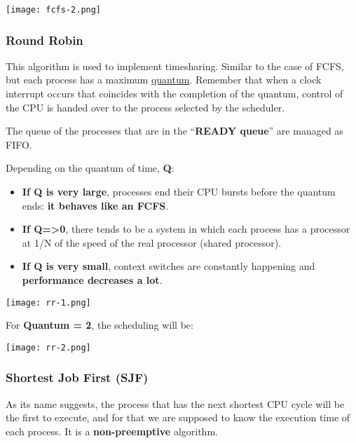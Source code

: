 \begin{center}
    \texttt{[image: fcfs-2.png]}
\end{center}


\subsubsection{Round Robin}

This algorithm is used to implement timesharing. Similar to the case of FCFS, but each process has a maximum \hyperlink{quantum}{quantum}. Remember that when a clock interrupt occurs that coincides with the completion of the quantum, control of the CPU is handed over to the process selected by the scheduler.

The queue of the processes that are in the “\textbf{READY queue}” are managed as FIFO.

Depending on the quantum of time, \textbf{Q}:

\begin{itemize}
    \item \textbf{If Q is very large}, processes end their CPU bursts before the quantum ends: \textbf{it behaves like an FCFS}.

    \item \textbf{If Q=>0}, there tends to be a system in which each process has a processor at 1/N of the speed of the real processor (shared processor).

    \item \textbf{If Q is very small}, context switches are constantly happening and \textbf{performance decreases a lot}.
\end{itemize}

\begin{center}
    \texttt{[image: rr-1.png]}
\end{center}

For \textbf{Quantum = 2}, the scheduling will be:

\begin{center}
    \texttt{[image: rr-2.png]}
\end{center}


\subsubsection{Shortest Job First (SJF)}

As its name suggests, the process that has the next shortest CPU cycle will be the first to execute, and for that we are supposed to know the execution time of each process. It is a \textbf{non-preemptive} algorithm.

